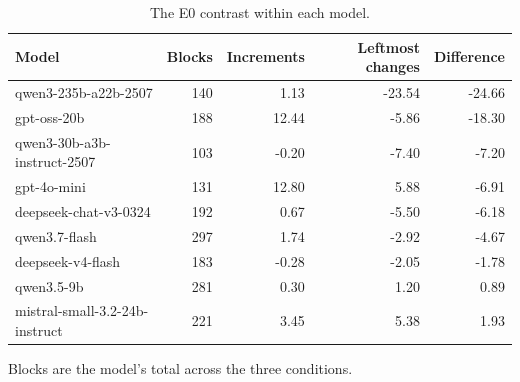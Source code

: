 \begin{table}[t]
\centering
\caption{The E0 contrast within each model.}
\label{tab:matchedmodel}
\small
\begin{tabular}{lrrrr}
\toprule
Model & Blocks & Increments & Leftmost changes & Difference \\
\midrule
qwen3-235b-a22b-2507 & 140 & 1.13 & -23.54 & -24.66 \\
gpt-oss-20b & 188 & 12.44 & -5.86 & -18.30 \\
qwen3-30b-a3b-instruct-2507 & 103 & -0.20 & -7.40 & -7.20 \\
gpt-4o-mini & 131 & 12.80 & 5.88 & -6.91 \\
deepseek-chat-v3-0324 & 192 & 0.67 & -5.50 & -6.18 \\
qwen3.7-flash & 297 & 1.74 & -2.92 & -4.67 \\
deepseek-v4-flash & 183 & -0.28 & -2.05 & -1.78 \\
qwen3.5-9b & 281 & 0.30 & 1.20 & 0.89 \\
mistral-small-3.2-24b-instruct & 221 & 3.45 & 5.38 & 1.93 \\
\bottomrule
\end{tabular}
\vspace{2pt}
\parbox{\linewidth}{\footnotesize Blocks are the model's total across the three conditions.}
\end{table}
